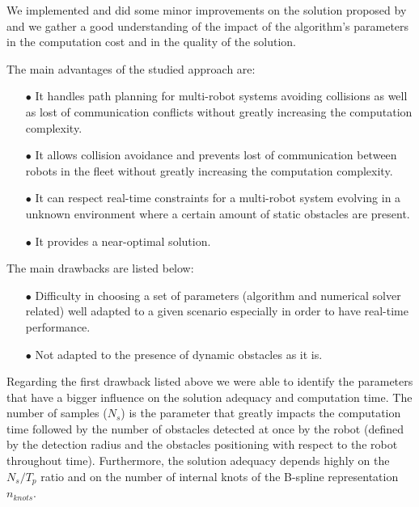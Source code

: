 We implemented and did some minor improvements on the solution proposed by \cite{Defoort2007a} and we gather a good understanding of the impact of the algorithm's parameters in the computation cost and in the quality of the solution.

The main advantages of the studied approach are:
\begin{itemize}
\item[$\bullet$] It handles path planning for multi-robot systems avoiding collisions as well as lost of communication conflicts without greatly increasing the computation complexity.
\item[$\bullet$] It allows collision avoidance and prevents lost of communication between robots in the fleet without greatly increasing the computation complexity.
\item[$\bullet$] It can respect real-time constraints for a multi-robot system evolving in a unknown environment where a certain amount of static obstacles are present.
\item[$\bullet$] It provides a near-optimal solution.
\end{itemize}

The main drawbacks are listed below:
\begin{itemize}
\item[$\bullet$] Difficulty in choosing a set of parameters (algorithm and numerical solver related) well adapted to a given scenario especially in order to have real-time performance.
\item[$\bullet$] Not adapted to the presence of dynamic obstacles as it is.
\end{itemize}

%


Regarding the first drawback listed above we were able to identify the parameters that have a bigger influence on the solution adequacy and computation time. The number of samples ($N_s$) is the parameter that greatly impacts the computation time followed by the number of obstacles detected at once by the robot (defined by the detection radius and the obstacles positioning with respect to the robot throughout time). Furthermore, the solution adequacy depends highly on the $N_s/T_p$ ratio and on the number of internal knots of the B-spline representation $n_{knots}$.

